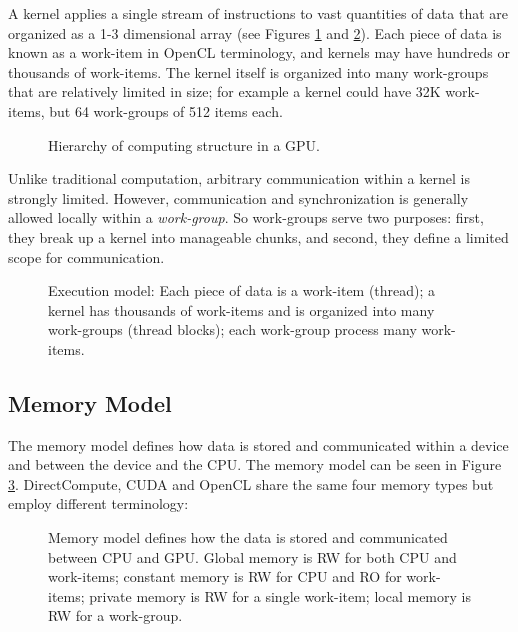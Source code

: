 \documentclass[Afour,sageh,times]{sagej}
\begin{document}
A kernel applies a single stream of instructions to vast quantities of data that are organized as a 1-3 dimensional array (see Figures \ref{figure:captura1paperCEC} and \ref{figure:grid}). Each piece of data is known as a work-item in OpenCL terminology, and kernels may have hundreds or thousands of work-items. The kernel itself is organized into many work-groups that are relatively limited in size; for example a kernel could have 32K work-items, but 64 work-groups of 512 items each.

\begin{figure}[!ht]
\centerline{}
\caption{Hierarchy of computing structure in a GPU.}
\label{figure:captura1paperCEC}
\end{figure}

Unlike traditional computation, arbitrary communication within a kernel is strongly limited. However, communication and synchronization is generally allowed locally within a {\it work-group}. So work-groups serve two purposes: first, they break up a kernel into manageable chunks, and second, they define a limited scope for communication. 

\begin{figure}[!ht]
\centerline{}
\caption{Execution model: Each piece of data is a work-item (thread); a kernel has thousands of work-items and is organized into many work-groups (thread blocks); each work-group process many work-items.}
\label{figure:grid}
\end{figure}

\subsection{Memory Model}

The memory model defines how data is stored and communicated within a device and between the device and the CPU. The memory model can be seen in Figure \ref{figure:memory}. DirectCompute, CUDA and OpenCL share the same four memory types but employ different terminology:

\begin{figure}
\centerline{}
\caption{Memory model defines how the data is stored and communicated between CPU and GPU. Global memory is RW for both CPU and work-items; constant memory is RW for CPU and RO for work-items; private memory is RW for a single work-item; local memory is RW for a work-group.}
\label{figure:memory}
\end{figure}
\end{document}

